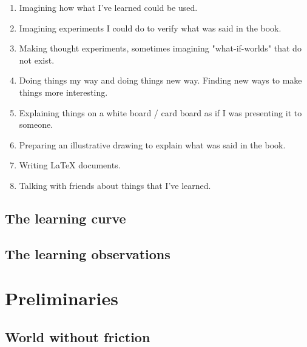 \documentclass[12pt]{report}
\begin{document}
\begin{enumerate}

\item Imagining how what I've learned could be used.

\item Imagining experiments I could do to verify what was said in the book.

\item Making thought experiments, sometimes imagining "what-if-worlds" that do not exist.

\item Doing things my way and doing things new way. Finding new ways to make things more interesting.

\item Explaining things on a white board / card board as if I was presenting it to someone.

\item Preparing an illustrative drawing to explain what was said in the book.

\item Writing LaTeX documents.

\item Talking with friends about things that I've learned. 


\end{enumerate}



\section{The learning curve} \label{chap:learning_curve}




\section{The learning observations} \label{chap:learning_observations}



\chapter{Preliminaries}



\section{World without friction} \label{chap:without_friction}
\end{document}

